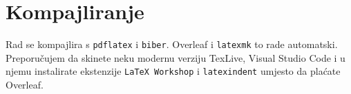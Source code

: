 \section{Kompajliranje}

	Rad se kompajlira s \texttt{pdflatex} i \texttt{biber}.
	Overleaf i \texttt{latexmk} to rade automatski.
	Preporučujem da skinete neku modernu verziju TexLive, Visual Studio Code i u
	njemu instalirate ekstenzije \texttt{LaTeX Workshop} i \texttt{latexindent}
	umjesto da plaćate Overleaf.
